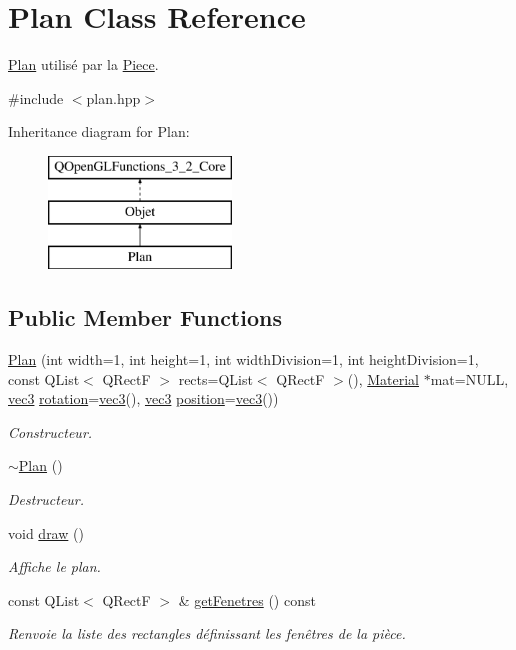 \hypertarget{class_plan}{\section{Plan Class Reference}
\label{class_plan}
}


\hyperlink{class_plan}{Plan} utilisé par la \hyperlink{class_piece}{Piece}.  




{\ttfamily \#include $<$plan.\+hpp$>$}

Inheritance diagram for Plan\+:\begin{figure}[H]
\begin{center}
\leavevmode
\includegraphics[height=3.000000cm]{class_plan}
\end{center}
\end{figure}
\subsection*{Public Member Functions}
\begin{DoxyCompactItemize}
\item 
\hyperlink{class_plan_ab74eeb948e40ade24bd54a60a4ece8c6}{Plan} (int width=1, int height=1, int width\+Division=1, int height\+Division=1, const Q\+List$<$ Q\+Rect\+F $>$ rects=Q\+List$<$ Q\+Rect\+F $>$(), \hyperlink{class_material}{Material} $\ast$mat=N\+U\+L\+L, \hyperlink{structvec3}{vec3} \hyperlink{class_objet_ac69a1b459bcb4433099c8cfbff06b209}{rotation}=\hyperlink{structvec3}{vec3}(), \hyperlink{structvec3}{vec3} \hyperlink{class_objet_a0e109bc790b14328202dd2546b04e2fd}{position}=\hyperlink{structvec3}{vec3}())
\begin{DoxyCompactList}\small\item\em Constructeur. \end{DoxyCompactList}\item 
\hyperlink{class_plan_a4df05d0211ed4572125f79cbfaafa626}{$\sim$\+Plan} ()
\begin{DoxyCompactList}\small\item\em Destructeur. \end{DoxyCompactList}\item 
void \hyperlink{class_plan_a513c3dec0ce9043a9e1d3b5b18a6d698}{draw} ()
\begin{DoxyCompactList}\small\item\em Affiche le plan. \end{DoxyCompactList}\item 
const Q\+List$<$ Q\+Rect\+F $>$ \& \hyperlink{class_plan_ac193f6297c584d43977dca3a16f18180}{get\+Fenetres} () const 
\begin{DoxyCompactList}\small\item\em Renvoie la liste des rectangles définissant les fenêtres de la pièce. \end{DoxyCompactList}\end{DoxyCompactItemize}
